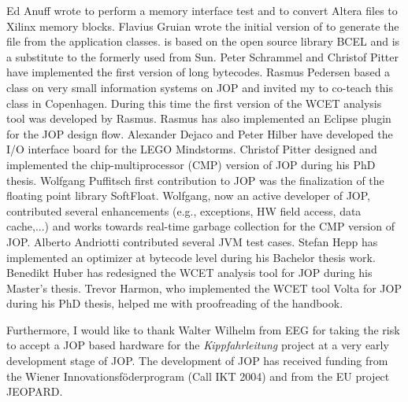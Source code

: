 Ed Anuff wrote  to perform a memory interface test
and  to convert Altera  files to
Xilinx memory blocks.
Flavius Gruian wrote the initial version of  to generate
the  file from the application classes.  is
based on the open source library BCEL and is a substitute to the
formerly used  from Sun. Peter Schrammel and
Christof Pitter have implemented the first version of long bytecodes.
Rasmus Pedersen based a class on very small information systems on
JOP and invited my to co-teach this class in Copenhagen. During this
time the first version of the WCET analysis tool was developed by
Rasmus. Rasmus has also implemented an Eclipse plugin for the JOP
design flow. Alexander Dejaco and Peter Hilber have developed the I/O
interface board for the LEGO Mindstorms. Christof Pitter designed and
implemented the chip-multiprocessor (CMP) version of JOP during his
PhD thesis. Wolfgang Puffitsch first contribution to JOP was the
finalization of the floating point library SoftFloat. Wolfgang, now
an active developer of JOP, contributed several enhancements (e.g.,
exceptions, HW field access, data cache,...) and works towards
real-time garbage collection for the CMP version of JOP. Alberto
Andriotti contributed several JVM test cases. Stefan Hepp has
implemented an optimizer at bytecode level during his Bachelor thesis
work. Benedikt Huber has redesigned the WCET analysis tool for JOP
during his Master's thesis. Trevor Harmon, who implemented the WCET
tool Volta for JOP during his PhD thesis, helped me with proofreading
of the handbook.

Furthermore, I would like to thank Walter Wilhelm from EEG for taking
the risk to accept a JOP based hardware for the
\emph{Kippfahrleitung} project at a very early development stage of
JOP. The development of JOP has received funding from the Wiener
Innovationsf\"oderprogram (Call IKT 2004) and from the EU project
JEOPARD.
